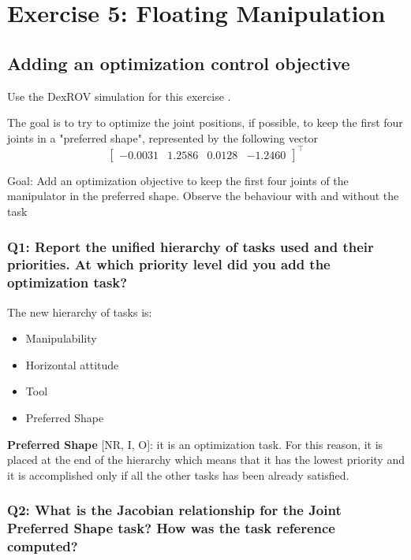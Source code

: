 \documentclass{article}
\begin{document}
\section{Exercise 5: Floating Manipulation}
\subsection{Adding an optimization control objective}
Use the DexROV simulation for this exercise .

The goal is to try to optimize the joint positions, if possible, to keep the first four joints in a "preferred shape", represented by the following vector
\begin{displaymath}
\begin{bmatrix}-0.0031 & 1.2586 & 0.0128 & -1.2460 \end{bmatrix}^\top
\end{displaymath}

Goal: Add an optimization objective to keep the first four joints of the manipulator in the preferred shape. Observe the behaviour with and without the task

\subsubsection{Q1: Report the unified hierarchy of tasks used and their priorities. At which priority level did you add the optimization task?}

The new hierarchy of tasks is:
\begin{itemize} 
 \item Manipulability
 \item Horizontal attitude
        \item Tool
        \item Preferred Shape 
\end{itemize}

\textbf{Preferred Shape} [NR, I, O]: it is an optimization task. For this reason, it is placed at the end of the hierarchy which means that it has the lowest priority and it is accomplished only if all the other tasks has been already satisfied. 

\subsubsection{Q2: What is the Jacobian relationship for the Joint Preferred Shape task? How was the task reference computed?}
\end{document}

